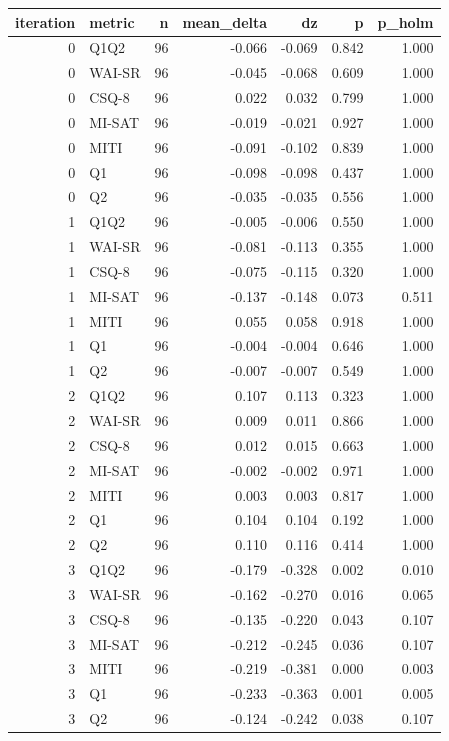 \begin{tabular}{rlrrrrr}
\toprule
iteration & metric & n & mean\_delta & dz & p & p\_holm \\
\midrule
0 & Q1Q2 & 96 & -0.066 & -0.069 & 0.842 & 1.000 \\
0 & WAI-SR & 96 & -0.045 & -0.068 & 0.609 & 1.000 \\
0 & CSQ-8 & 96 & 0.022 & 0.032 & 0.799 & 1.000 \\
0 & MI-SAT & 96 & -0.019 & -0.021 & 0.927 & 1.000 \\
0 & MITI & 96 & -0.091 & -0.102 & 0.839 & 1.000 \\
0 & Q1 & 96 & -0.098 & -0.098 & 0.437 & 1.000 \\
0 & Q2 & 96 & -0.035 & -0.035 & 0.556 & 1.000 \\
1 & Q1Q2 & 96 & -0.005 & -0.006 & 0.550 & 1.000 \\
1 & WAI-SR & 96 & -0.081 & -0.113 & 0.355 & 1.000 \\
1 & CSQ-8 & 96 & -0.075 & -0.115 & 0.320 & 1.000 \\
1 & MI-SAT & 96 & -0.137 & -0.148 & 0.073 & 0.511 \\
1 & MITI & 96 & 0.055 & 0.058 & 0.918 & 1.000 \\
1 & Q1 & 96 & -0.004 & -0.004 & 0.646 & 1.000 \\
1 & Q2 & 96 & -0.007 & -0.007 & 0.549 & 1.000 \\
2 & Q1Q2 & 96 & 0.107 & 0.113 & 0.323 & 1.000 \\
2 & WAI-SR & 96 & 0.009 & 0.011 & 0.866 & 1.000 \\
2 & CSQ-8 & 96 & 0.012 & 0.015 & 0.663 & 1.000 \\
2 & MI-SAT & 96 & -0.002 & -0.002 & 0.971 & 1.000 \\
2 & MITI & 96 & 0.003 & 0.003 & 0.817 & 1.000 \\
2 & Q1 & 96 & 0.104 & 0.104 & 0.192 & 1.000 \\
2 & Q2 & 96 & 0.110 & 0.116 & 0.414 & 1.000 \\
3 & Q1Q2 & 96 & -0.179 & -0.328 & 0.002 & 0.010 \\
3 & WAI-SR & 96 & -0.162 & -0.270 & 0.016 & 0.065 \\
3 & CSQ-8 & 96 & -0.135 & -0.220 & 0.043 & 0.107 \\
3 & MI-SAT & 96 & -0.212 & -0.245 & 0.036 & 0.107 \\
3 & MITI & 96 & -0.219 & -0.381 & 0.000 & 0.003 \\
3 & Q1 & 96 & -0.233 & -0.363 & 0.001 & 0.005 \\
3 & Q2 & 96 & -0.124 & -0.242 & 0.038 & 0.107 \\
\bottomrule
\end{tabular}
